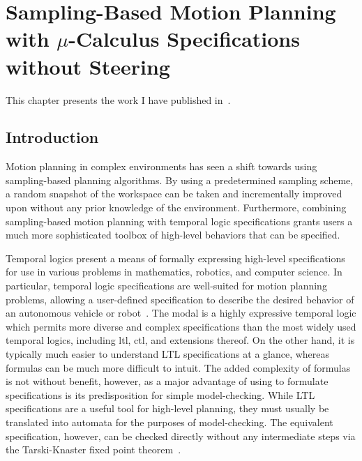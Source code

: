 
\chapter{\texorpdfstring{Sampling-Based Motion Planning with $\mu$-Calculus Specifications without Steering}{Sampling-Based Motion Planning with mu-Calculus Specifications without Steering}}
\label{chap:sstpaper}

This chapter presents the work I have published in~\cite{Larocque2018}.

\section{Introduction}

Motion planning in complex environments has seen a shift towards using sampling-based planning algorithms. By using a predetermined sampling scheme, a random snapshot of the workspace can be taken and incrementally improved upon without any prior knowledge of the environment. Furthermore, combining sampling-based motion planning with temporal logic specifications grants users a much more sophisticated toolbox of high-level behaviors that can be specified. 

Temporal logics present a means of formally expressing high-level specifications for use in various problems in mathematics, robotics, and computer science. In particular, temporal logic specifications are well-suited for motion planning problems, allowing a user-defined specification to describe the desired behavior of an autonomous vehicle or robot~\cite{Lin2014, Wolff2014}. The modal \mucalc{} is a highly expressive temporal logic which permits more diverse and complex specifications than the most widely used temporal logics, including \gls{ltl}, \gls{ctl}, and extensions thereof. On the other hand, it is typically much easier to understand LTL specifications at a glance, whereas \mucalc{} formulas can be much more difficult to intuit. The added complexity of \mucalc{} formulas is not without benefit, however, as a major advantage of using \mucalc{} to formulate specifications is its predisposition for simple model-checking. While LTL specifications are a useful tool for high-level planning, they must usually be translated into automata for the purposes of model-checking. The equivalent \mucalc{} specification, however, can be checked directly without any intermediate steps via the Tarski-Knaster fixed point theorem~\cite{Emerson1999, Tarski1955}.

